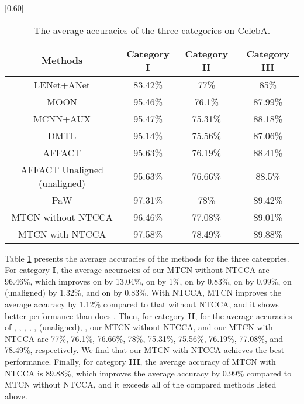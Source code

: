\documentclass{sig-alternate-05-2015}
\begin{document}
\begin{table}[!hbpt]
\centering
\caption{The average accuracies of the three categories on CelebA.}
\scalebox{0.65}[0.60]{%
\begin{tabular}{c|c|c|c}
\toprule[2pt]
\textbf{Methods} & \textbf{Category I}&\textbf{Category II}&\textbf{Category III}\\\midrule[1pt]
LENet+ANet\cite{7410782}&83.42\%&77\%&85\%\\
\hline
MOON\cite{rudd2016moon}&95.46\%&76.1\%&87.99\%\\
\hline
MCNN+AUX\cite{hand2017attributes}&95.47\%&75.31\%&88.18\%\\
\hline
DMTL\cite{Han2017Heterogeneous}&95.14\%&75.56\%&87.06\%\\
\hline
AFFACT\cite{gunther2016affact}&95.63\%&76.19\%&88.41\%\\
\hline
AFFACT Unaligned\cite{gunther2016affact} (unaligned)&95.63\%&76.66\%&88.5\%\\
\hline
PaW\cite{ding2017deep}&97.31\%&78\%&89.42\%\\
\hline
MTCN without NTCCA&96.46\%&77.08\%&89.01\%\\
\hline
MTCN with NTCCA&97.58\%&78.49\%&89.88\%\\
\bottomrule[2pt]
\end{tabular}}
\label{tab:025}
\end{table}



  Table \ref{tab:025} presents the average accuracies of the methods for the three categories. For category \textbf{I}, the average accuracies of our MTCN without NTCCA are 96.46\%, which improves on \cite{7410782} by 13.04\%, on \cite{rudd2016moon} by 1\%, on \cite{hand2017attributes} by 0.83\%, on \cite{gunther2016affact} by 0.99\%, on \cite{gunther2016affact} (unaligned) by 1.32\%, and on \cite{ding2017deep} by 0.83\%. With NTCCA, MTCN improves the average accuracy by 1.12\% compared to that without NTCCA, and it shows better performance than does \cite{Han2017Heterogeneous}. Then, for category \textbf{II}, for the average accuracies of \cite{7410782}, \cite{rudd2016moon}, \cite{hand2017attributes},  \cite{Han2017Heterogeneous}, \cite{gunther2016affact}, \cite{gunther2016affact} (unaligned), \cite{ding2017deep}, our MTCN without NTCCA, and our MTCN with NTCCA  are 77\%, 76.1\%, 76.66\%, 78\%, 75.31\%, 75.56\%, 76.19\%, 77.08\%, and 78.49\%, respectively. We find that our MTCN with NTCCA achieves the best performance. Finally, for category \textbf{III}, the average accuracy of MTCN with NTCCA is 89.88\%, which improves the average accuracy by 0.99\% compared to MTCN without NTCCA, and it exceeds all of the compared methods listed above.
\end{document}
